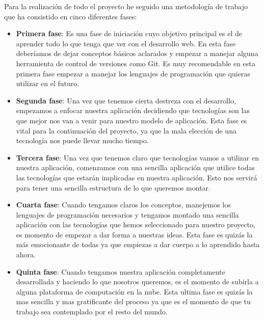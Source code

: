 Para la realización de todo el proyecto he seguido una metodología de trabajo que ha consistido en cinco diferentes fases:

\begin{itemize}

\item \textbf {Primera fase}: Es una fase de iniciación cuyo objetivo principal es el de aprender todo lo que tenga que ver con el desarrollo web. En esta fase deberíamos de dejar conceptos básicos aclarados y empezar a manejar alguna herramienta de control de versiones como Git. Es muy recomendable en esta primera fase empezar a manejar los lenguajes de programación que quieras utilizar en el futuro.

\item \textbf {Segunda fase}: Una vez que tenemos cierta destreza con el desarrollo, empezamos a enfocar nuestra aplicación decidiendo que tecnologías son las que mejor nos van a venir para nuestro modelo de aplicación. Esta fase es vital para la continuación del proyecto, ya que la mala elección de una tecnología nos puede llevar mucho tiempo.

\item \textbf {Tercera fase}: Una vez que tenemos claro que tecnologías vamos a utilizar en nuestra aplicación, comenzamos con una sencilla aplicación que utilice todas las tecnologías que estarán implicadas en nuestra aplicación. Esto nos servirá para tener una sencilla estructura de lo que queremos montar.

\item \textbf {Cuarta fase}: Cuando tengamos claros los conceptos, manejemos los lenguajes de programación necesarios y tengamos montado una sencilla aplicación con las tecnologías que hemos seleccionado para nuestro proyecto, es momento de empezar a dar forma a nuestras ideas. Esta fase es quizás la más emocionante de todas ya que empiezas a dar cuerpo a lo aprendido hasta ahora. 

\item \textbf {Quinta fase}: Cuando tengamos nuestra aplicación completamente desarrollada y haciendo lo que nosotros queremos, es el momento de subirla a alguna plataforma de computación en la nube. Esta ultima fase es quizás la mas sencilla y mas gratificante del proceso ya que es el momento de que tu trabajo sea contemplado por el resto del mundo.

\end{itemize}



